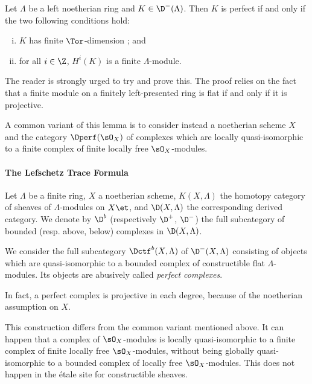 \begin{lem} \label{lem:CharacterizingPerfectObjects}
Let $\Lambda$ be a left noetherian ring and $K\in \D^-(\Lambda)$. Then $K$ is perfect if and only if the two following conditions hold:
\begin{enumerate}[i.]
\item
$K$ has finite $\Tor$-dimension ; and
\item
for all $i \in \Z$, $H^i(K)$ is a finite $\Lambda$-module.
\end{enumerate} 
\end{lem}

The reader is strongly urged to try and prove this. The proof relies on the fact that a finite module on a finitely left-presented ring is flat if and only if it is projective. 

\begin{remark}
A common variant of this lemma is to consider instead a noetherian scheme $X$ and the category $\Dperf(\sO_X)$ of complexes which are locally quasi-isomorphic to a finite complex of finite locally free $\sO_X$-modules.
\end{remark}

\paragraph{The Lefschetz Trace Formula}

\begin{defi}
Let $\Lambda$ be a finite ring, $X$ a noetherian scheme,  $K(X, \Lambda)$ the homotopy category of sheaves of $\Lambda$-modules on $X\et$, and $\D(X, \Lambda)$ the corresponding derived category. We denote by $\D^b$ (respectively $\D^+$, $\D^-$) the full subcategory of bounded (resp. above, below) complexes in $\D(X, \Lambda)$.

We consider the full subcategory $\Dctf^b (X, \Lambda)$ of $\D^-(X, \Lambda)$ consisting of objects which are quasi-isomorphic to a bounded complex of constructible flat $\Lambda$-modules. Its objects are abusively called \emph{perfect complexes}.
\end{defi} 

\begin{remark}
In fact, a perfect complex is projective in each degree, because of the noetherian assumption on $X$. 
\end{remark}

\begin{remark}
This construction differs from the common variant mentioned above. It can happen that a complex of $\sO_X$-modules is locally quasi-isomorphic to a finite complex of finite locally free $\sO_X$-modules, without being globally quasi-isomorphic to a bounded complex of locally free $\sO_X$-modules. This does not happen in the \'etale site for constructible sheaves.
\end{remark}


